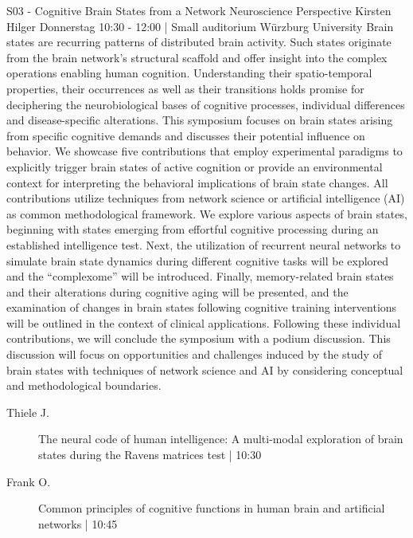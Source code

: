 
            \begin{symposium}
            {S03 - Cognitive Brain States from a Network Neuroscience Perspective }
            {Kirsten Hilger}
            {Donnerstag 10:30 - 12:00 | Small auditorium}
            {Würzburg University}
            Brain states are recurring patterns of distributed brain activity. Such states originate from the brain network's structural scaffold and offer insight into the complex operations enabling human cognition. Understanding their spatio-temporal properties, their occurrences as well as their transitions holds promise for deciphering the neurobiological bases of cognitive processes, individual differences and disease-specific alterations.
This symposium focuses on brain states arising from specific cognitive demands and discusses their potential influence on behavior. We showcase five contributions that employ experimental paradigms to explicitly trigger brain states of active cognition or provide an environmental context for interpreting the behavioral implications of brain state changes. All contributions utilize techniques from network science or artificial intelligence (AI) as common methodological framework.
We explore various aspects of brain states, beginning with states emerging from effortful cognitive processing during an established intelligence test. Next, the utilization of recurrent neural networks to simulate brain state dynamics during different cognitive tasks will be explored and the “complexome” will be introduced. Finally, memory-related brain states and their alterations during cognitive aging will be presented, and the examination of changes in brain states following cognitive training interventions will be outlined in the context of clinical applications.
Following these individual contributions, we will conclude the symposium with a podium discussion. This discussion will focus on opportunities and challenges induced by the study of brain states with techniques of network science and AI by considering conceptual and methodological boundaries.
            \begin{description}    
            
                \item [ Thiele J.] The neural code of human intelligence: A multi-modal exploration of brain states during the Ravens matrices test \textcolor{mygray}{ | 10:30}    
                
                \item [ Frank O.] Common principles of cognitive functions in human brain and artificial networks  \textcolor{mygray}{ | 10:45}    
                

\end{description}
\end{symposium}
